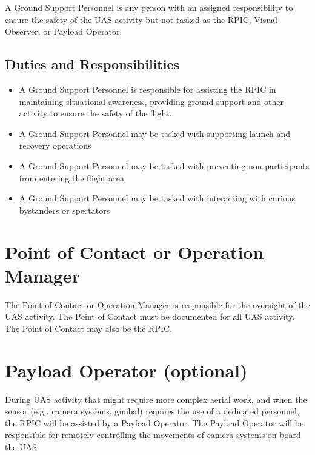 \documentclass[
]{book}
\providecommand{\tightlist}{%
  \setlength{\itemsep}{0pt}\setlength{\parskip}{0pt}}
\begin{document}
A Ground Support Personnel is any person with an assigned responsibility to ensure the safety of the UAS activity but not tasked as the RPIC, Visual Observer, or Payload Operator.

\hypertarget{duties-and-responsibilities-4}{%
\subsection{Duties and Responsibilities}\label{duties-and-responsibilities-4}}

\begin{itemize}
\tightlist
\item
  A Ground Support Personnel is responsible for assisting the RPIC in maintaining situational awareness, providing ground support and other activity to ensure the safety of the flight.
\item
  A Ground Support Personnel may be tasked with supporting launch and recovery operations
\item
  A Ground Support Personnel may be tasked with preventing non-participants from entering the flight area
\item
  A Ground Support Personnel may be tasked with interacting with curious bystanders or spectators
\end{itemize}

\hypertarget{point-of-contact-or-operation-manager}{%
\section{Point of Contact or Operation Manager}\label{point-of-contact-or-operation-manager}}

The Point of Contact or Operation Manager is responsible for the oversight of the UAS activity. The Point of Contact must be documented for all UAS activity. The Point of Contact may also be the RPIC.

\hypertarget{payload-operator-optional}{%
\section{Payload Operator (optional)}\label{payload-operator-optional}}

During UAS activity that might require more complex aerial work, and when the sensor (e.g., camera systems, gimbal) requires the use of a dedicated personnel, the RPIC will be assisted by a Payload Operator. The Payload Operator will be responsible for remotely controlling the movements of camera systems on-board the UAS.
\end{document}
